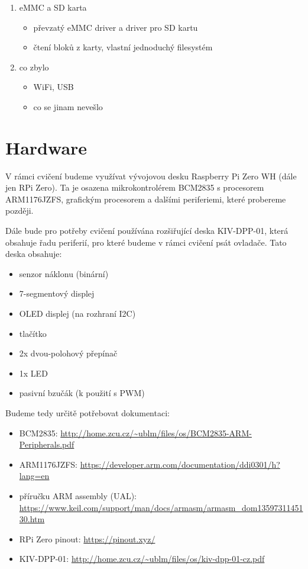 \documentclass{article}
\newcommand\lang[2]{#1}
\begin{document}
\begin{enumerate}
	\item \lang{eMMC a SD karta}{eMMC and SD card}
	\begin{itemize}
		\item \lang{převzatý eMMC driver a driver pro SD kartu}{opensource eMMC driver, SD card driver}
		\item \lang{čtení bloků z karty, vlastní jednoduchý filesystém}{reading from SD card, simple filesystem}
	\end{itemize}

	\item \lang{co zbylo}{the rest}
	\begin{itemize}
		\item WiFi, USB
		\item \lang{co se jinam nevešlo}{the rest what we didn't cover}
	\end{itemize}
\end{enumerate}

\section{Hardware}

V rámci cvičení budeme využívat vývojovou desku Raspberry Pi Zero WH (dále jen RPi Zero). Ta je osazena mikrokontrolérem BCM2835 s procesorem ARM1176JZFS, grafickým procesorem a dalšími periferiemi, které probereme později.

Dále bude pro potřeby cvičení používána rozšiřující deska KIV-DPP-01, která obsahuje řadu periferií, pro které budeme v rámci cvičení psát ovladače. Tato deska obsahuje:\\
\begin{itemize}
	\item senzor náklonu (binární)
	\item 7-segmentový displej
	\item OLED displej (na rozhraní I2C)
	\item tlačítko
	\item 2x dvou-polohový přepínač
	\item 1x LED
	\item pasivní bzučák (k použití s PWM)
\end{itemize}
Budeme tedy určitě potřebovat dokumentaci:

\begin{itemize}
	\item BCM2835: \url{http://home.zcu.cz/~ublm/files/os/BCM2835-ARM-Peripherals.pdf}
	\item ARM1176JZFS: \url{https://developer.arm.com/documentation/ddi0301/h?lang=en}
	\item příručku ARM assembly (UAL): \url{https://www.keil.com/support/man/docs/armasm/armasm_dom1359731145130.htm}
	\item RPi Zero pinout: \url{https://pinout.xyz/}
	\item KIV-DPP-01: \url{http://home.zcu.cz/~ublm/files/os/kiv-dpp-01-cz.pdf}
\end{itemize}
\end{document}
